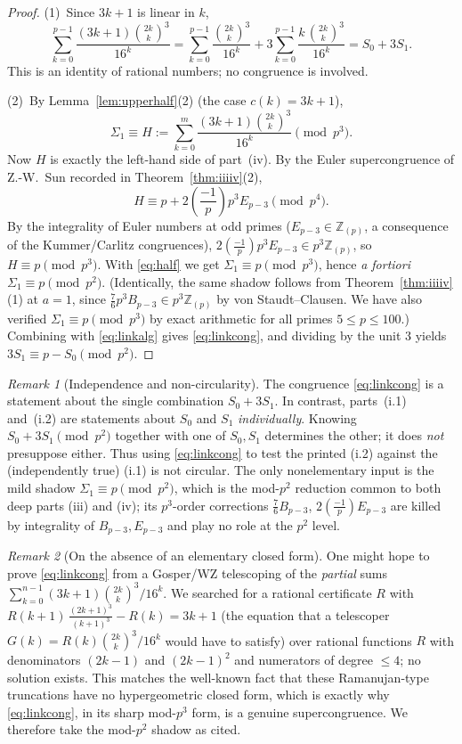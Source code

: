 \documentclass[12pt]{article}
\theoremstyle{remark}
\newtheorem{remark}{Remark}
\newcommand{\leg}[2]{\left(\frac{#1}{#2}\right)}
\newcommand{\bin}[2]{\binom{#1}{#2}}
\newcommand{\Zp}{\mathbb{Z}_{(p)}}
\begin{document}
\begin{proof}
(1)\ Since $3k+1$ is linear in $k$,
\[
\sum_{k=0}^{p-1}\frac{(3k+1)\bin{2k}{k}^3}{16^k}
=\sum_{k=0}^{p-1}\frac{\bin{2k}{k}^3}{16^k}
+3\sum_{k=0}^{p-1}\frac{k\,\bin{2k}{k}^3}{16^k}
=S_0+3S_1 .
\]
This is an identity of rational numbers; no congruence is involved.

(2)\ By Lemma~\ref{lem:upperhalf}(2) (the case $c(k)=3k+1$),
\begin{equation}\label{eq:half}
\Sigma_1\equiv H:=\sum_{k=0}^{m}\frac{(3k+1)\bin{2k}{k}^3}{16^k}\pmod{p^3}.
\end{equation}
Now $H$ is exactly the left-hand side of part~(iv).  By the Euler
supercongruence of Z.-W.~Sun recorded in Theorem~\ref{thm:iiiiv}(2),
\[
H\equiv p+2\leg{-1}{p}p^3E_{p-3}\pmod{p^4}.
\]
By the integrality of Euler numbers at odd primes ($E_{p-3}\in\Zp$, a
consequence of the Kummer/Carlitz congruences), $2\leg{-1}{p}p^3E_{p-3}\in
p^3\Zp$, so $H\equiv p\pmod{p^3}$.  With \eqref{eq:half} we get
$\Sigma_1\equiv p\pmod{p^3}$, hence \emph{a fortiori}
$\Sigma_1\equiv p\pmod{p^2}$.  (Identically, the same shadow follows from
Theorem~\ref{thm:iiiiv}(1) at $a=1$, since $\tfrac76p^3B_{p-3}\in p^3\Zp$ by
von Staudt--Clausen.  We have also verified $\Sigma_1\equiv p\pmod{p^3}$ by
exact arithmetic for all primes $5\le p\le100$.)  Combining with
\eqref{eq:linkalg} gives \eqref{eq:linkcong}, and dividing by the unit $3$
yields $3S_1\equiv p-S_0\pmod{p^2}$.
\end{proof}

\begin{remark}[Independence and non-circularity]\label{rem:indep}
The congruence \eqref{eq:linkcong} is a statement about the single combination
$S_0+3S_1$.  In contrast, parts~(i.1) and~(i.2) are statements about $S_0$ and
$S_1$ \emph{individually}.  Knowing $S_0+3S_1\pmod{p^2}$ together with one of
$S_0,S_1$ determines the other; it does \emph{not} presuppose either.  Thus
using \eqref{eq:linkcong} to test the printed (i.2) against the (independently
true) (i.1) is not circular.  The only nonelementary input is the mild shadow
$\Sigma_1\equiv p\pmod{p^2}$, which is the mod-$p^2$ reduction common to both
deep parts (iii) and (iv); its $p^3$-order corrections $\tfrac76 B_{p-3}$,
$2\leg{-1}{p}E_{p-3}$ are killed by integrality of $B_{p-3},E_{p-3}$ and play
no role at the $p^2$ level.
\end{remark}

\begin{remark}[On the absence of an elementary closed form]
One might hope to prove \eqref{eq:linkcong} from a Gosper/WZ telescoping of the
\emph{partial} sums $\sum_{k=0}^{n-1}(3k+1)\binom{2k}{k}^3/16^k$.  We searched
for a rational certificate $R$ with
$R(k+1)\,\tfrac{(2k+1)^3}{(k+1)^3}-R(k)=3k+1$ (the equation that a telescoper
$G(k)=R(k)\binom{2k}{k}^3/16^k$ would have to satisfy) over rational functions
$R$ with denominators $(2k-1)$ and $(2k-1)^2$ and numerators of degree $\le4$;
no solution exists.  This matches the well-known fact that these
Ramanujan-type truncations have no hypergeometric closed form, which is exactly
why \eqref{eq:linkcong}, in its sharp mod-$p^3$ form, is a genuine
supercongruence.  We therefore take the mod-$p^2$ shadow as cited.
\end{remark}
\end{document}
